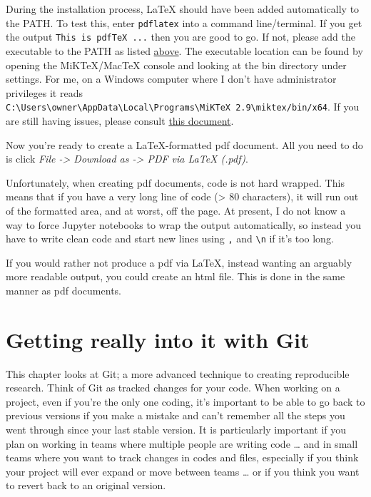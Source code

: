 \documentclass[]{book}
\begin{document}
During the installation process, LaTeX should have been added automatically to the PATH. To test this, enter \texttt{pdflatex} into a command line/terminal. If you get the output \texttt{This\ is\ pdfTeX\ ...} then you are good to go. If not, please add the executable to the PATH as listed \protect\hyperlink{env-variables}{above}. The executable location can be found by opening the MiKTeX/MacTeX console and looking at the bin directory under settings. For me, on a Windows computer where I don't have administrator privileges it reads \texttt{C:\textbackslash{}Users\textbackslash{}owner\textbackslash{}AppData\textbackslash{}Local\textbackslash{}Programs\textbackslash{}MiKTeX\ 2.9\textbackslash{}miktex/bin/x64}. If you are still having issues, please consult \href{http://sachaepskamp.com/wp-content/uploads/2011/10/Install.pdf}{this document}.

Now you're ready to create a LaTeX-formatted pdf document. All you need to do is click \emph{File -\textgreater{} Download as -\textgreater{} PDF via LaTeX (.pdf)}.

Unfortunately, when creating pdf documents, code is not hard wrapped. This means that if you have a very long line of code (\textgreater{} 80 characters), it will run out of the formatted area, and at worst, off the page. At present, I do not know a way to force Jupyter notebooks to wrap the output automatically, so instead you have to write clean code and start new lines using \texttt{,} and \texttt{\textbackslash{}n} if it's too long.

If you would rather not produce a pdf via LaTeX, instead wanting an arguably more readable output, you could create an html file. This is done in the same manner as pdf documents.

\hypertarget{getting-really-into-it-with-git}{%
\chapter{Getting really into it with Git}\label{getting-really-into-it-with-git}}

This chapter looks at Git; a more advanced technique to creating reproducible research. Think of Git as tracked changes for your code. When working on a project, even if you're the only one coding, it's important to be able to go back to previous versions if you make a mistake and can't remember all the steps you went through since your last stable version. It is particularly important if you plan on working in teams where multiple people are writing code \ldots{} and in small teams where you want to track changes in codes and files, especially if you think your project will ever expand or move between teams \ldots{} or if you think you want to revert back to an original version.
\end{document}
